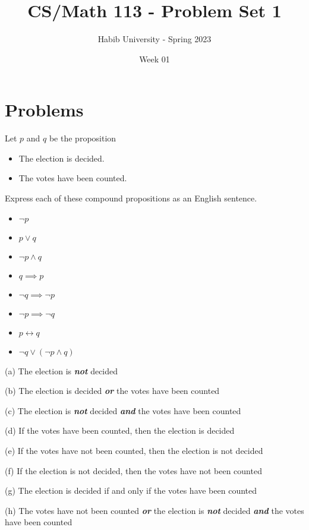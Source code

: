 \documentclass[addpoints]{exam}
\title{CS/Math 113 - Problem Set 1}
\author{Habib University - Spring 2023}
\date{Week 01}
\newenvironment{problem}[2][Problem]{\begin{trivlist}
    \item[\hskip \labelsep {\bfseries #1}\hskip \labelsep {\bfseries #2.}]}{\end{trivlist}}
\begin{document}
\maketitle
\section{Problems}

\begin{problem}{1}
Let $p$ and $q$ be the proposition
\begin{itemize}
    \item[$p:$] The election is decided.
    \item[$q:$] The votes have been counted.
\end{itemize}
Express each of these compound propositions as an English sentence.

\begin{itemize}
    \item[(a)] $\neg p$
    \item[(b)] $p \lor q$
    \item[(c)] $\neg p \land q $
    \item[(d)] $q \implies p $
    \item[(e)] $ \neg q \implies \neg p $
    \item[(f)] $\neg p \implies \neg q$
    \item[(g)] $p \leftrightarrow q$
    \item[(h)] $\neg q \lor (\neg p \land q) $
\end{itemize}
\end{problem}

\begin{questions}
    \question
    \begin{solution}
        
        (a) The election is \textbf{\textit{not}} decided

        (b) The election is decided \textbf{\textit{or}} the votes have been counted

        (c) The election is \textbf{\textit{not}} decided \textbf{\textit{and}} the votes have been counted

        (d) If the votes have been counted, then the election is decided

        (e) If the votes have not been counted, then the election is not decided 

        (f) If the election is not decided, then the votes have not been counted 

        (g) The election is decided if and only if the votes have been counted

        (h) The votes have not been counted \textbf{\textit{or}} the election is \textbf{\textit{not}} decided \textbf{\textit{and}} the votes have been counted
    \end{solution}
\end{questions}
\end{document}
